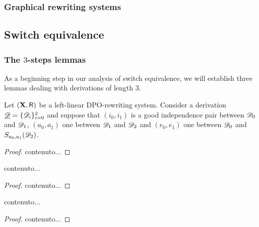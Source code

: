 \begin{example}\label{ex:contro}
\end{example}



\subsubsection{Graphical rewriting systems}\label{subsubsec:graphical}


\subsection{Switch equivalence}

\subsubsection{The $3$-steps lemmas} 

As a beginning step in our analysis of switch equivalence, we will establish three lemmas  dealing with derivations of length $3$. 


\begin{lemma}\label{lem:primo}
Let $(\textbf {\textup{X}},\mathsf{R})$ be a left-linear DPO-rewriting system. Consider a derivation $\underline{\mathscr{D}}=\{\mathscr{D}_i\}_{i=0}^2$ and suppose that $(i_0,i_1)$ is a good independence pair between $\mathscr{D}_0$ and $\mathscr{D}_1$, $(a_0,a_1)$ one between $\mathscr{D}_1$ and $\mathscr{D}_2$ and $(e_0, e_1)$ one between $\mathscr{D}_0$ and $S_{a_0,a_1}(\mathscr{D}_2)$.
\end{lemma}
\begin{proof}
	contenuto...
\end{proof}


\begin{lemma}\label{lem:secondo}
	contenuto...
\end{lemma}
\begin{proof}
	contenuto...
\end{proof}



\begin{lemma}\label{lem:terzo}
	contenuto...
\end{lemma}
\begin{proof}
	contenuto...
\end{proof}


